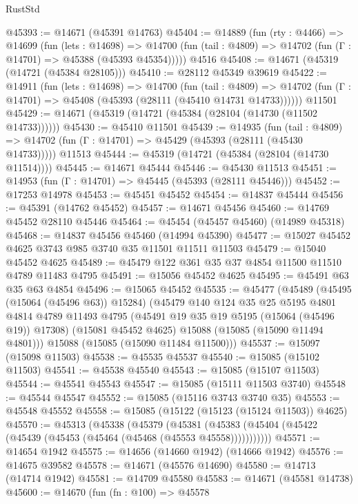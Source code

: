 \begin{lexlean}{RustStd}
\begin{coremodule}
@45393 := @14671 (@45391 @14763)
@45404 := @14889
    (fun (rty : @4466) =>
    @14699
      (fun (lets : @14698) =>
      @14700 (fun (tail : @4809) => @14702 (fun (Γ : @14701) => @45388 (@45393 @45354)))))
    @4516
@45408 := @14671 (@45319 (@14721 (@45384 @28105)))
@45410 := @28112 @45349 @39619
@45422 := @14911
    (fun (lets : @14698) =>
    @14700
      (fun (tail : @4809) =>
      @14702 (fun (Γ : @14701) => @45408 (@45393 (@28111 (@45410 @14731 @14733))))))
    @11501
@45429 := @14671 (@45319 (@14721 (@45384 (@28104 (@14730 (@11502 @14733))))))
@45430 := @45410 @11501
@45439 := @14935
    (fun (tail : @4809) => @14702 (fun (Γ : @14701) => @45429 (@45393 (@28111 (@45430 @14733)))))
    @11513
@45444 := @45319 (@14721 (@45384 (@28104 (@14730 @11514))))
@45445 := @14671 @45444
@45446 := @45430 @11513
@45451 := @14953 (fun (Γ : @14701) => @45445 (@45393 (@28111 @45446)))
@45452 := @17253 @14978
@45453 := @45451 @45452
@45454 := @14837 @45444
@45456 := @45391 (@14762 @45452)
@45457 := @14671 @45456
@45460 := @14769 @45452 @28110 @45446
@45464 := @45454 (@45457 @45460) (@14989 @45318)
@45468 := @14837 @45456 @45460 (@14994 @45390)
@45477 := @15027 @45452 @4625 @3743 @985 @3740 @35 @11501 @11511 @11503
@45479 := @15040 @45452 @4625
@45489 := @45479 @122 @361 @35 @37 @4854 @11500 @11510 @4789 @11483 @4795
@45491 := @15056 @45452 @4625
@45495 := @45491 @63 @35 @63 @4854
@45496 := @15065 @45452
@45535 := @45477
    (@45489
      (@45495 (@15064 (@45496 @63)) @15284)
      (@45479
        @140
        @124
        @35
        @25
        @5195
        @4801
        @4814
        @4789
        @11493
        @4795
        (@45491 @19 @35 @19 @5195 (@15064 (@45496 @19)) @17308)
        (@15081 @45452 @4625)
        @15088
        (@15085 (@15090 @11494 @4801)))
      @15088
      (@15085 (@15090 @11484 @11500)))
@45537 := @15097 (@15098 @11503)
@45538 := @45535 @45537
@45540 := @15085 (@15102 @11503)
@45541 := @45538 @45540
@45543 := @15085 (@15107 @11503)
@45544 := @45541 @45543
@45547 := @15085 (@15111 @11503 @3740)
@45548 := @45544 @45547
@45552 := @15085 (@15116 @3743 @3740 @35)
@45553 := @45548 @45552
@45558 := @15085 (@15122 (@15123 (@15124 @11503)) @4625)
@45570 := @45313
    (@45338
      (@45379
        (@45381 (@45383 (@45404 (@45422 (@45439 (@45453 (@45464 (@45468 (@45553 @45558)))))))))))
@45571 := @14654 @1942
@45575 := @14656 (@14660 @1942) (@14666 @1942)
@45576 := @14675 @39582
@45578 := @14671 (@45576 @14690)
@45580 := @14713 (@14714 @1942)
@45581 := @14709 @45580
@45583 := @14671 (@45581 @14738)
@45600 := @14670
    (fun (fn : @100) =>
    @45578

\end{coremodule}
\end{lexlean}
